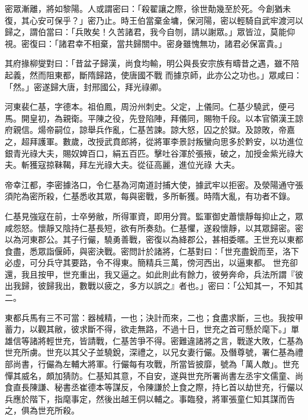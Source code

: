 \begin{pinyinscope}
 密眾漸離，將如黎陽。人或謂密曰：「殺翟讓之際，徐世勣幾至於死。今創猶未復，其心安可保乎？」密乃止。時王伯當棄金墉，保河陽，密以輕騎自武牢渡河以歸之，謂伯當曰：「兵敗矣！久苦諸君，我今自刎，請以謝眾。」眾皆泣，莫能仰視。密復曰：「諸君幸不相棄，當共歸關中。密身雖愧無功，諸君必保富貴。」



 其府掾柳燮對曰：「昔盆子歸漢，尚食均輸，明公與長安宗族有疇昔之遇，雖不陪起義，然而阻東都，斷隋歸路，使唐國不戰
 而據京師，此亦公之功也。」眾咸曰：「然。」密遂歸大唐，封邢國公，拜光祿卿。



 河東裴仁基，字德本。祖伯鳳，周汾州刺史。父定，上儀同。仁基少驍武，便弓馬。開皇初，為親衛。平陳之役，先登陷陣，拜儀同，賜物千段。以本官領漢王諒府親信。煬帝嗣位，諒舉兵作亂，仁基苦諫。諒大怒，囚之於獄。及諒敗，帝嘉之，超拜護軍。數歲，改授武賁郎將，從將軍李景討叛蠻向思多於黔安，以功進位銀青光祿大夫，賜奴婢百口，絹五百匹。擊吐谷渾於張掖，破之，加授金紫光祿大夫。斬獲寇掠靺鞨，拜左光祿大夫。從征高麗，進位光祿
 大夫。



 帝幸江都，李密據洛口，令仁基為河南道討捕大使，據武牢以拒密。及滎陽通守張須陀為密所殺，仁基悉收其眾，每與密戰，多所斬獲。時隋大亂，有功者不錄。



 仁基見強寇在前，士卒勞敝，所得軍資，即用分賞。監軍御史蕭懷靜每抑止之，眾咸怨怒。懷靜又陰持仁基長短，欲有所奏劾。仁基懼，遂殺懷靜，以其眾歸密。密以為河東郡公。其子行儼，驍勇善戰，密復以為絳郡公，甚相委暱。王世充以東都食盡，悉眾詣偃師，與密決戰。密問計於諸將，仁基對曰：「世充盡銳而至，洛下必虛，可分兵守其要路，令不得東。簡精兵三萬，傍河西出，以逼東都。
 世充卻還，我且按甲，世充重出，我又逼之。如此則此有餘力，彼勞奔命，兵法所謂『彼出我歸，彼歸我出，數戰以疲之，多方以誤之』者也。」密曰：「公知其一，不知其二。



 東都兵馬有三不可當：器械精，一也；決計而來，二也；食盡求斷，三也。我按甲蓄力，以觀其敝，彼求斷不得，欲走無路，不過十日，世充之首可懸於麾下。」單雄信等諸將輕世充，皆請戰，仁基苦爭不得。密難違諸將之言，戰遂大敗，仁基為世充所虜。世充以其父子並驍銳，深禮之，以兄女妻行儼。及僭尊號，署仁基為禮部尚書，行儼為左輔大將軍。行儼每有攻戰，所當皆披靡，號為「萬人敵」。世充
 憚其威名，頗加猜防。仁基知其意，不自安，遂與世充所署尚書左丞宇文儒童、尚食直長陳謙、秘書丞崔德本等謀反，令陳謙於上食之際，持匕首以劫世充，行儼以兵應於階下，指麾事定，然後出越王侗以輔之。事臨發，將軍張童仁知其謀而告之，俱為世充所殺。




\end{pinyinscope}

